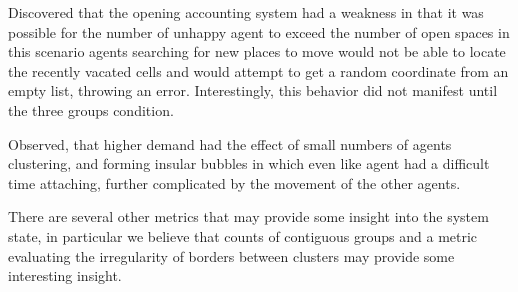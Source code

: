 \documentclass[sigplan,nonacm]{acmart}
\begin{document}
Discovered that the opening accounting system had a weakness in that it was possible for the number of unhappy agent to exceed the number of open spaces
in this scenario agents searching for new places to move would not be able to locate the recently vacated cells and would
attempt to get a random coordinate from an empty list, throwing an error. Interestingly, this behavior did not manifest until the three groups condition.



Observed, that higher demand had the effect of small numbers of agents clustering, and forming insular bubbles in which even like agent had a difficult time
attaching, further complicated by the movement of the other agents.



There are several other metrics that may provide some insight into the system state, in particular we believe that 
counts of contiguous groups and a metric evaluating the irregularity of borders between clusters may provide some interesting insight.



\end{document}
